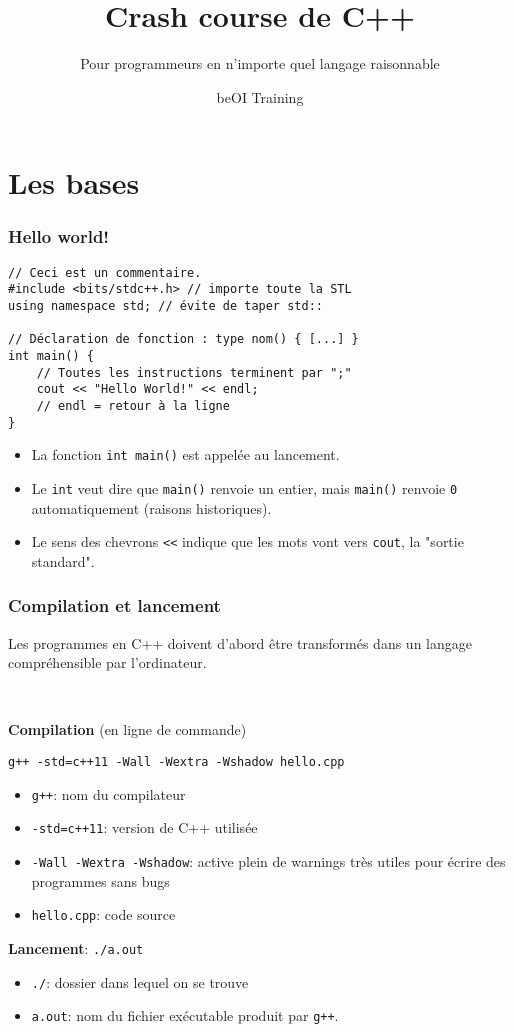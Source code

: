 \documentclass[12pt]{beamer}
\title{Crash course de C++}
\subtitle{Pour programmeurs en n'importe quel langage raisonnable}
\author{beOI Training}
\institute{\texttt{[image: ../share/beoi-logo]}}
\date{}
\begin{document}
\maketitle


\section{Les bases}

\begin{frame}[fragile]
\frametitle{Hello world!}
\begin{lstlisting}
// Ceci est un commentaire.
#include <bits/stdc++.h> // importe toute la STL
using namespace std; // évite de taper std::

// Déclaration de fonction : type nom() { [...] }
int main() {
    // Toutes les instructions terminent par ";"
    cout << "Hello World!" << endl;
    // endl = retour à la ligne
}
\end{lstlisting}
\begin{itemize}
\item La fonction \lstinline|int main()| est appelée au lancement.
\item Le \lstinline|int| veut dire que \lstinline|main()| renvoie un entier, mais \lstinline|main()| renvoie \lstinline|0| automatiquement (raisons historiques).
\item Le sens des chevrons \lstinline|<<| indique que les mots vont vers \lstinline|cout|, la "sortie standard".
\end{itemize}
\end{frame}

\begin{frame}[fragile]
\frametitle{Compilation et lancement}
Les programmes en C++ doivent d'abord être transformés dans un langage compréhensible par l'ordinateur.

~

\textbf{Compilation} (en ligne de commande)
\begin{lstlisting}
g++ -std=c++11 -Wall -Wextra -Wshadow hello.cpp
\end{lstlisting}
\begin{itemize}
\item \lstinline|g++|: nom du compilateur
\item \lstinline|-std=c++11|: version de C++ utilisée
\item \lstinline|-Wall -Wextra -Wshadow|: active plein de warnings très utiles pour écrire des programmes sans bugs
\item \lstinline|hello.cpp|: code source
\end{itemize}

\textbf{Lancement}: \lstinline|./a.out|
\begin{itemize}
\item \lstinline|./|: dossier dans lequel on se trouve
\item \lstinline|a.out|: nom du fichier exécutable produit par \lstinline|g++|.
\end{itemize}
\end{frame}
\end{document}
